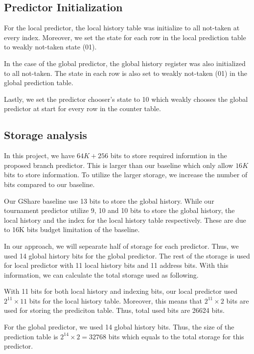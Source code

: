 \documentclass[conference]{IEEEtran}
\begin{document}
\subsection{Predictor Initialization}

For the local predictor, the local history table was initialize to all not-taken at every
index. Moreover, we set the state for each row in the local prediction table to weakly not-taken
state (01).

In the case of the global predictor, the global history register was also initialized to all not-taken.
The state in each row is also set to weakly not-taken (01) in the global prediction table.

Lastly, we set the predictor chooser's state to 10 which weakly chooses the global predictor
at start for every row in the counter table.

\subsection{Storage analysis}

In this project, we have $64K + 256$ bits to store required informtion in the proposed branch
predictor. This is larger than our baseline which only allow $16K$ bits to store information.
To utilize the larger storage, we increase the number of bits compared to our baseline.

Our GShare baseline use 13 bits to store the global history. While our tournament predictor
utilize 9, 10 and 10 bits to store the global history, the local history and the index for the
local history table respectively. These are due to 16K bits budget limitation of the baseline.

In our approach, we will sepearate half of storage for each predictor. Thus, we used 14 global
history bits for the global predictor. The rest of the storage is used for local predictor with
11 local history bits and 11 address bits. With this information, we can calculate the total
storage used as following.

With 11 bits for both local history and indexing bits, our local predictor used $2^{11} \times 11$
bits for the local history table. Moreover, this means that $2^{11} \times 2$ bits are used for
storing the prediciton table. Thus, total used bits are 26624 bits. 

For the global predictor, we used 14 global history bits. Thus, the size of the prediction
table is $2^14 \times 2 = 32768$ bits which equals to the total storage for this predictor.
\end{document}
